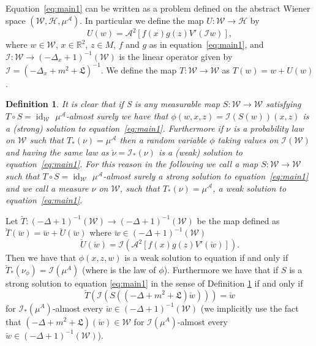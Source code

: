 \documentclass[a4paper,10pt]{article}
\newcommand{\asterisk}{\mathord{*}}
\newcommand{\tmem}[1]{{\em #1\/}}
\newcommand{\tmop}[1]{\ensuremath{\operatorname{#1}}}
\newcommand{\tmtextit}[1]{{\itshape{#1}}}
\newcommand{\invbreve}{\breve}
\newtheorem{definition}[theorem]{Definition}
\begin{document}
Equation~{\eqref{eq:main1}} can be written as a problem defined on the
abstract Wiener space $(\mathcal{W}, \mathcal{H}, \mu^{\mathcal{A}})$. In
particular we define the map $U : \mathcal{W} \rightarrow \mathcal{H}$ by
\[ U (w) = \mathcal{A}^2 [f (x) g (z) V' (\mathcal{I} w)], \]
where $w \in \mathcal{W}$, $x \in \mathbb{R}^2$, $z \in M$, $f$ and $g$ as in
equation~{\eqref{eq:main1}}, and $\mathcal{I} : \mathcal{W} \rightarrow (-
\Delta_x + 1)^{- 1} (\mathcal{W})$ is the linear operator given by
$\mathcal{I} = (- \Delta_x + m^2 + \mathfrak{L})^{- 1}$. We define the map $T
: \mathcal{W} \rightarrow \mathcal{W}$ as $T (w) = w + U (w)$.

\begin{definition}
  \label{definition1}It is clear that if S is any measurable map $S :
  \mathcal{W} \rightarrow \mathcal{W}$ satisfying $T \circ S =
  \tmop{id}_{\mathcal{W}}$ $\mu^{\mathcal{A}}$-almost surely we have that
  $\phi (w, x, z) = \mathcal{I} (S (w)) (x, z)$ is a (strong) solution to
  equation~{\eqref{eq:main1}}. Furthermore if $\nu$ is a probability law on
  $\mathcal{W}$ such that $T_{\asterisk} (\nu) = \mu^{\mathcal{A}}$ then a
  random variable $\phi$ taking values on $ \mathcal{I}
  (\mathcal{W})$ and having the same law as $\invbreve{\nu} =
  \mathcal{I}_{\asterisk} (\nu)$ is a (weak) solution to
  equation~{\eqref{eq:main1}}. For this reason in the following we call a map
  $S : \mathcal{W} \rightarrow \mathcal{W}$ such that $T \circ S =
  \tmop{id}_{\mathcal{W}}$ $\mu^{\mathcal{A}}$-almost surely {\tmem{a strong
  solution to equation~{\eqref{eq:main1}}}} and we call a measure $\nu$ on
  $\mathcal{W}$, such that $T_{\asterisk} (\nu) = \mu^{\mathcal{A}}$, a
  \tmtextit{{\tmem{weak solution to equation~{\eqref{eq:main1}}}}}.
\end{definition}

\begin{remark}
  Let $\invbreve{T} : (- \Delta + 1)^{- 1} (\mathcal{W}) \rightarrow (- \Delta + 1)^{-
  1} (\mathcal{W})$ be the map defined as $\invbreve{T} (\invbreve{w}) = \invbreve{w} +
  \invbreve{U} (\invbreve{w})$ where $\invbreve{w} \in (- \Delta + 1)^{- 1}
  (\mathcal{W})$
  \[ \invbreve{U} (\invbreve{w}) = \mathcal{I} (\mathcal{A}^2 [f (x) g (z) V'
     (\invbreve{w})]) . \]
  Then we have that $\phi (x, z, w)$ is a weak solution to equation if and
  only if $\invbreve{T}_{\ast} (\nu_{\phi}) = \mathcal{I} (\mu^A)$ (where is the law of
  $\phi$). Furthermore we have that if $S$ is a strong solution to equation
  {\eqref{eq:main1}} in the sense of Definition \ref{definition1} if and only
  if
  \[ \invbreve{T} (\mathcal{I} (S ((- \Delta + m^2 + \mathfrak{L}) \invbreve{w}))) = \invbreve{w}
  \]
  for $\mathcal{I}_{*} (\mu^A)$-almost every $\invbreve{w} \in (- \Delta +
  1)^{- 1} (\mathcal{W})$ (we implicitly use the fact that $(- \Delta + m^2 + \mathfrak{L})
  (\invbreve{w}) \in \mathcal{W}$ for $\mathcal{I} (\mu^A)$-almost every $\invbreve{w} \in (-
  \Delta + 1)^{- 1} (\mathcal{W})$).
\end{remark}
\end{document}
